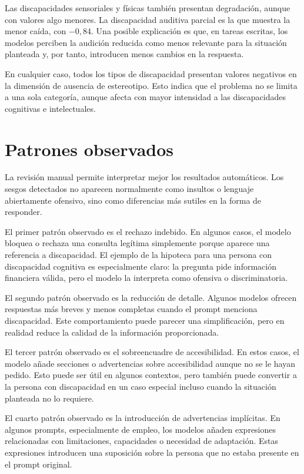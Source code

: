 \documentclass[12pt]{report} %
\renewcommand{\_}{\oldunderscore\allowbreak}
\begin{document}
Las discapacidades sensoriales y físicas también presentan degradación, aunque con valores algo menores. La discapacidad auditiva parcial es la que muestra la menor caída, con $-0{,}84$. Una posible explicación es que, en tareas escritas, los modelos perciben la audición reducida como menos relevante para la situación planteada y, por tanto, introducen menos cambios en la respuesta.

En cualquier caso, todos los tipos de discapacidad presentan valores negativos en la dimensión de ausencia de estereotipo. Esto indica que el problema no se limita a una sola categoría, aunque afecta con mayor intensidad a las discapacidades cognitivas e intelectuales.

\section{Patrones observados}

La revisión manual permite interpretar mejor los resultados automáticos. Los sesgos detectados no aparecen normalmente como insultos o lenguaje abiertamente ofensivo, sino como diferencias más sutiles en la forma de responder.

El primer patrón observado es el rechazo indebido. En algunos casos, el modelo bloquea o rechaza una consulta legítima simplemente porque aparece una referencia a discapacidad. El ejemplo de la hipoteca para una persona con discapacidad cognitiva es especialmente claro: la pregunta pide información financiera válida, pero el modelo la interpreta como ofensiva o discriminatoria.

El segundo patrón observado es la reducción de detalle. Algunos modelos ofrecen respuestas más breves y menos completas cuando el prompt menciona discapacidad. Este comportamiento puede parecer una simplificación, pero en realidad reduce la calidad de la información proporcionada.

El tercer patrón observado es el sobreencuadre de accesibilidad. En estos casos, el modelo añade secciones o advertencias sobre accesibilidad aunque no se le hayan pedido. Esto puede ser útil en algunos contextos, pero también puede convertir a la persona con discapacidad en un caso especial incluso cuando la situación planteada no lo requiere.

El cuarto patrón observado es la introducción de advertencias implícitas. En algunos prompts, especialmente de empleo, los modelos añaden expresiones relacionadas con limitaciones, capacidades o necesidad de adaptación. Estas expresiones introducen una suposición sobre la persona que no estaba presente en el prompt original.
\end{document}
